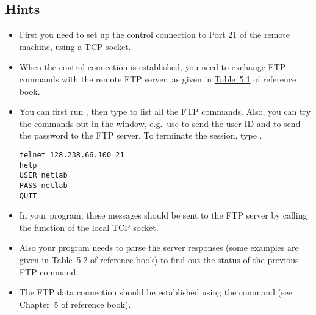 \documentclass{../UTNetLab}
\begin{document}
\subsection*{Hints}
\begin{itemize}
    \item First you need to set up the control connection to Port 21 of the remote machine, using a TCP socket.
    \item When the control connection is established, you need to exchange FTP commands with the remote FTP server, as given in \hyperref[tab:5.1]{Table~5.1} of reference book.
    \item You can first run , then type  to list all the FTP commands.
          Also, you can try the commands out in the  window, e.g.\ use  to send the user ID and  to send the password to the FTP server.
          To terminate the  session, type .
          
          \begin{lstlisting}
telnet 128.238.66.100 21
help
USER netlab
PASS netlab
QUIT
          \end{lstlisting}
    \item In your program, these messages should be sent to the FTP server by calling the  function of the local TCP socket.
    \item Also your program needs to parse the server responses (some examples are given in \hyperref[tab:5.2]{Table~5.2} of reference book) to find out the status of the previous FTP command.
    \item The FTP data connection should be established using the  command (see Chapter~5 of reference book).
\end{itemize}
\end{document}
